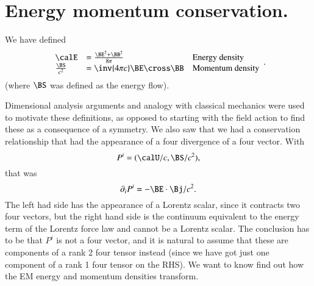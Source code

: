 %
%
\section{Energy momentum conservation.}

We have defined
%
\begin{equation}\label{eqn:relativisticElectrodynamicsL21b:320}
\begin{array}{l l l}
\calE &= \frac{\BE^2 + \BB^2}{8\pi} & \mbox{Energy density} \\
\frac{\BS}{c^2} &= \inv{4 \pi c} \BE \cross \BB & \mbox{Momentum density}
\end{array}.
\end{equation}
%
(where \(\BS\) was defined as the energy flow).

Dimensional analysis arguments and analogy with classical mechanics were used to motivate these definitions, as opposed to starting with the field action to find these as a consequence of a symmetry.  We also saw that we had a conservation relationship that had the appearance of a four divergence of a four vector.  With
%
\begin{equation}\label{eqn:relativisticElectrodynamicsL21b:340}
P^i = (\calU/c, \BS/c^2),
\end{equation}
%
that was
%
\begin{equation}\label{eqn:relativisticElectrodynamicsL21b:360}
\partial_i P^i = - \BE \cdot \Bj/c^2.
\end{equation}
%
The left had side has the appearance of a Lorentz scalar, since it contracts two four vectors, but the right hand side is the continuum equivalent to the energy term of the Lorentz force law and cannot be a Lorentz scalar.  The conclusion has to be that \(P^i\) is not a four vector, and it is natural to assume that these are components of a rank 2 four tensor instead (since we have got just one component of a rank 1 four tensor on the RHS).  We want to know find out how the EM energy and momentum densities transform.
%
